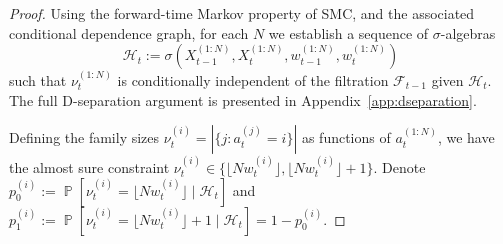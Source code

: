 \documentclass{article} %
\theoremstyle{definition}
\DeclareMathOperator{\Prob}{\mathbb{P}}
\newcommand{\flnw}{\lfloor N w_t^{(i)} \rfloor}
\newcommand{\1}[1]{\mathbbm{1}_{\{#1\}}}
\begin{document}
\begin{proof}
Using the forward-time Markov property of SMC, and the associated conditional dependence graph, for each $N$ we establish a sequence of $\sigma$-algebras
\begin{equation}\label{eq:defn_Ht}
\mathcal{H}_t := \sigma(X_{t-1}^{(1:N)}, X_t^{(1:N)}, w_{t-1}^{(1:N)}, w_t^{(1:N)} )
\end{equation}
such that $\nu_t^{(1:N)}$ is conditionally independent of the filtration $\mathcal{F}_{t-1}$ given $\mathcal{H}_t$. The full D-separation argument is presented in Appendix~\ref{app:dseparation}.

Defining the family sizes $\nu_t^{(i)} = |\{ j : a_t^{(j)} = i \}|$ as functions of $a_t^{(1:N)}$, we have the almost sure constraint $\nu_t^{(i)} \in \{\flnw, \flnw +1\}$.  Denote $p_0^{(i)} := \Prob[ \nu_t^{(i)} = \flnw \mid \mathcal{H}_t ]$ and $p_1^{(i)} := \Prob[ \nu_t^{(i)} = \flnw +1 \mid \mathcal{H}_t ] = 1-p_0^{(i)}$. 


\end{proof}
\end{document}
